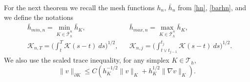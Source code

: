 \documentclass{amsart}
\numberwithin{equation}{section}
\theoremstyle{definition}
\begin{document}
For the next theorem we recall the mesh functions $h_n,\,\bar h_n$
from \eqref{hn}, \eqref{barhn}, and we define the notations
\begin{equation*}
  \begin{aligned}
    &\bar h_{min,n}=\min_{K\in \bar{\mathcal T}_h^n}\bar h_{K}, 
      &&\bar h_{max,n}=\max_{K\in \bar {\mathcal T}_h^n}\bar h_{K},\\
    &{\mathcal K}_{n,T}=\Big( \int_t^T\! {\mathcal K}(s-t)\ ds \Big)^{1/2}, 
      &&{\mathcal K}_{n,j}=\Big( \int_{t\vee t_{j-1}}^{t_j}\! {\mathcal K}(s-t)\ ds \Big)^{1/2}.
  \end{aligned}
\end{equation*}
We also use the scaled trace inequality, for any simplex $K \in {\mathcal T}_h$,
\begin{equation} \label{scaledtraceineq}
  \|v\|_{\partial K}\leq C(h_K^{-1/2} \|v\|_K 
    + h_K^{1/2} \|\nabla v\|_K).
\end{equation}
\end{document}
